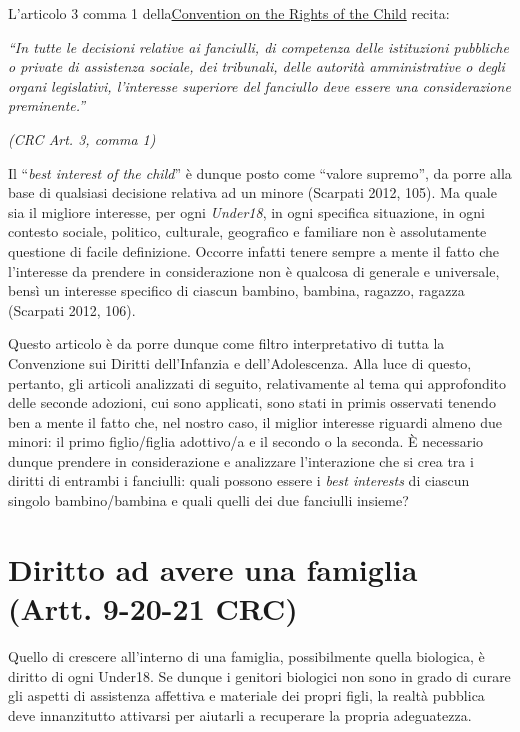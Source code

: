 \documentclass[12pt,oneside,svgnames]{memoir}
\begin{document}
L'articolo 3 comma 1 della\href{http://www.unicef.org/crc/}{Convention
on the Rights of the Child} recita:

\emph{``In tutte le decisioni relative ai fanciulli, di competenza delle
istituzioni pubbliche o private di assistenza sociale, dei tribunali,
delle autorità amministrative o degli organi legislativi, l'interesse
superiore del fanciullo deve essere una considerazione preminente.''}

\emph{(CRC Art. 3, comma 1)}

Il ``\emph{best interest of the child}'' è dunque posto come ``valore
supremo'', da porre alla base di qualsiasi decisione relativa ad un
minore (Scarpati 2012, 105). Ma quale sia il migliore interesse, per
ogni \emph{Under18}, in ogni specifica situazione, in ogni contesto
sociale, politico, culturale, geografico e familiare non è assolutamente
questione di facile definizione. Occorre infatti tenere sempre a mente
il fatto che l'interesse da prendere in considerazione non è qualcosa di
generale e universale, bensì un interesse specifico di ciascun bambino,
bambina, ragazzo, ragazza (Scarpati 2012, 106).

Questo articolo è da porre dunque come filtro interpretativo di tutta la
Convenzione sui Diritti dell'Infanzia e dell'Adolescenza. Alla luce di
questo, pertanto, gli articoli analizzati di seguito, relativamente al
tema qui approfondito delle seconde adozioni, cui sono applicati, sono
stati in primis osservati tenendo ben a mente il fatto che, nel nostro
caso, il miglior interesse riguardi almeno due minori: il primo
figlio/figlia adottivo/a e il secondo o la seconda. È necessario dunque
prendere in considerazione e analizzare l'interazione che si crea tra i
diritti di entrambi i fanciulli: quali possono essere i \emph{best
interests} di ciascun singolo bambino/bambina e quali quelli dei due
fanciulli insieme?

\section{Diritto ad avere una famiglia (Artt. 9-20-21
CRC)}\label{diritto-ad-avere-una-famiglia-artt.-9-20-21-crc}

Quello di crescere all'interno di una famiglia, possibilmente quella
biologica, è diritto di ogni Under18. Se dunque i genitori biologici non
sono in grado di curare gli aspetti di assistenza affettiva e materiale
dei propri figli, la realtà pubblica deve innanzitutto attivarsi per
aiutarli a recuperare la propria adeguatezza.
\end{document}
